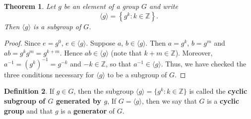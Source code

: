 \documentclass[11pt]{article}
\newcommand{\Z} {{\mathbb Z}}
\newcommand{\set}[1]{\left\{#1\right\}}
\newcommand{\<}{\ensuremath{\langle}}
\renewcommand{\>}{\ensuremath{\rangle}}
\newcommand{\eye}{\ensuremath{e}}
\theoremstyle{plain}
\newtheorem{thm}{Theorem}%
\theoremstyle{definition}
\newtheorem{defn}[thm]{Definition}
\begin{document}
\begin{thm}
  Let $g$ be an element of a group $G$ and write
$$\langle g\rangle = \set{g^k: k\in \Z}.$$
Then $\langle g\rangle$ is a subgroup of $G$.
\end{thm}
\begin{proof}  Since $\eye=g^0$, $\eye\in \langle g\rangle$.  Suppose $a$,
$b\in \langle g\rangle$.  Then $a=g^k$, $b=g^m$ and
$ab=g^kg^m=g^{k+m}$. Hence $ab\in \langle g\rangle$ (note that
$k+m\in \Z$).  Moreover, $a^{-1} = (g^k)^{-1} = g^{-k}$ and $-k\in
\Z$, so that $a^{-1}\in \langle g\rangle$.  Thus, we have checked
the three conditions necessary for $\langle g\rangle$ to be a
subgroup of $G$.
\end{proof}
\begin{defn}  If $g\in G$, then the subgroup $\langle g\rangle = \{g^k:
k\in \Z\}$ is called the {\bf cyclic subgroup of $G$ generated by
$g$}, If $G=\langle g\rangle$, then we say that $G$ is a {\bf
cyclic group} and that $g$ is a {\bf generator} of $G$.
\end{defn}
\end{document}
